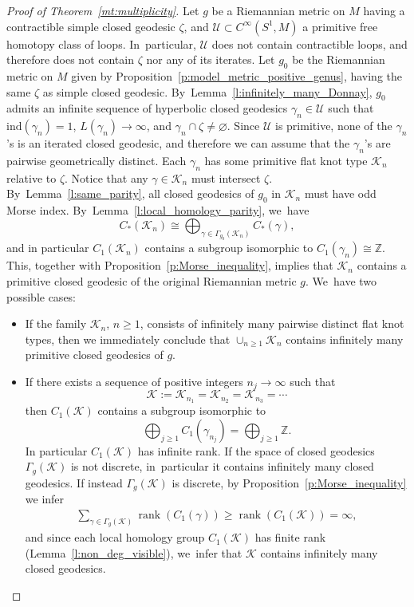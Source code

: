 \documentclass[11pt]{article}
\newcommand{\Z}{\mathbb{Z}}
\newcommand{\KK}{\mathcal{K}}
\newcommand{\UU}{\mathcal{U}}
\newcommand{\ind}{\mathrm{ind}}
\DeclareMathOperator{\rank}{rank}
\theoremstyle{plain}
\theoremstyle{definition}
\begin{document}
\begin{proof}[Proof of Theorem~\ref{mt:multiplicity}]
Let $g$ be a Riemannian metric on $M$ having a contractible simple closed geodesic $\zeta$, and $\UU\subset C^\infty(S^1,M)$ a primitive free homotopy class of loops. In~particular, $\UU$ does not contain contractible loops, and therefore does not contain $\zeta$ nor any of its iterates.
Let $g_0$ be the Riemannian metric on $M$ given by Proposition~\ref{p:model_metric_positive_genus}, having the same $\zeta$ as simple closed geodesic. By~Lemma~\ref{l:infinitely_many_Donnay}, $g_0$ admits an infinite sequence of hyperbolic closed geodesics $\gamma_n\in\UU$ such that $\ind(\gamma_n)=1$, $L(\gamma_n)\to\infty$, and $\gamma_n\cap\zeta\neq\varnothing$. Since $\UU$ is primitive, none of the $\gamma_n$'s is an iterated closed geodesic, and therefore we can assume that the $\gamma_n$'s are pairwise geometrically distinct. Each $\gamma_n$ has some primitive flat knot type $\KK_n$ relative to $\zeta$. Notice that any $\gamma\in\KK_n$ must intersect $\zeta$. By~Lemma~\ref{l:same_parity}, all closed geodesics of $g_0$ in $\KK_n$ must have odd Morse index. By~Lemma~\ref{l:local_homology_parity}, we~have
\[
C_*(\KK_n) \cong \bigoplus_{\gamma\in\Gamma_{g_0}(\KK_n)} C_*(\gamma),
\]
and in particular $C_1(\KK_n)$ contains a subgroup isomorphic to $C_1(\gamma_n)\cong\Z$. This, together with Proposition~\ref{p:Morse_inequality}, implies that $\KK_n$ contains a primitive closed geodesic of the original Riemannian metric $g$. We~have two possible cases:
\begin{itemize}
\item If the family $\KK_n$, $n\geq1$, consists of infinitely many pairwise distinct flat knot types, then we immediately conclude that $\cup_{n\geq1}\KK_n$ contains infinitely many primitive closed geodesics of $g$.

\item If there exists a sequence of positive integers $n_j\to\infty$ such that
\[
\KK:=\KK_{n_1}=\KK_{n_2}=\KK_{n_3}=\cdots
\]
then $C_1(\KK)$ contains a subgroup isomorphic to
\[
\bigoplus_{j\geq1}C_1(\gamma_{n_j})=\bigoplus_{j\geq1}\Z.
\]
In particular $C_1(\KK)$ has infinite rank.
If the space of closed geodesics $\Gamma_g(\KK)$ is not discrete, in~particular it contains infinitely many closed geodesics. If instead $\Gamma_g(\KK)$ is discrete, by Proposition~\ref{p:Morse_inequality} we infer
\begin{align*}
\sum_{\gamma\in\Gamma_g(\KK)}
\rank(C_1(\gamma))
\geq
\rank(C_1(\KK))
=\infty,
\end{align*}
and since each local homology group $C_1(\KK)$ has finite rank (Lemma~\ref{l:non_deg_visible}), we~infer that $\KK$ contains infinitely many closed geodesics.
\qedhere
\end{itemize}
\end{proof}
\end{document}
